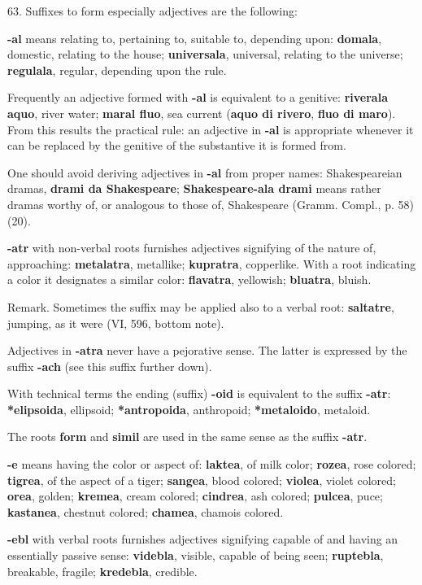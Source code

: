 63. Suffixes to form especially adjectives are the following: 

\textbf{-al} means relating to, pertaining to, suitable to, depending upon: \textbf{domala}, domestic, relating to the house; \textbf{universala}, universal, relating to the universe; \textbf{regulala}, regular, depending upon the rule. 

Frequently an adjective formed with \textbf{-al} is equivalent to a genitive: \textbf{riverala aquo}, river water; \textbf{maral fluo}, sea current (\textbf{aquo di rivero}, \textbf{fluo di maro}). From this results the practical rule: an adjective in \textbf{-al} is appropriate whenever it can be replaced by the genitive of the substantive it is formed from. 

One should avoid deriving adjectives in \textbf{-al} from proper names: Shakespeareian dramas, \textbf{drami da Shakespeare}; \textbf{Shakespeare-ala drami} means rather dramas worthy of, or analogous to those of, Shakespeare (Gramm. Compl., p. 58) (20).

\textbf{-atr} with non-verbal roots furnishes adjectives signifying of the nature of, approaching: \textbf{metalatra}, metallike; \textbf{kupratra}, copperlike. With a root indicating a color it designates a similar color: \textbf{flavatra}, yellowish; \textbf{bluatra}, bluish. 

\small Remark. Sometimes the suffix may be applied also to a verbal root: \textbf{saltatre}, jumping, as it were (VI, 596, bottom note). \normalsize

Adjectives in \textbf{-atra} never have a pejorative sense. The latter is expressed by the suffix \textbf{-ach} (see this suffix further down).

With technical terms the ending (suffix) \textbf{-oid} is equivalent to the suffix \textbf{-atr}: \textbf{*elipsoida}, ellipsoid; \textbf{*antropoida}, anthropoid; \textbf{*metaloido}, metaloid. 

The roots \textbf{form} and \textbf{simil} are used in the same sense as the suffix \textbf{-atr}. 

\textbf{-e} means having the color or aspect of: \textbf{laktea}, of milk color; \textbf{rozea}, rose colored; \textbf{tigrea}, of the aspect of a tiger; \textbf{sangea}, blood colored; \textbf{violea}, violet colored; \textbf{orea}, golden; \textbf{kremea}, cream colored; \textbf{cindrea}, ash colored; \textbf{pulcea}, puce; \textbf{kastanea}, chestnut colored; \textbf{chamea}, chamois colored. 

\textbf{-ebl} with verbal roots furnishes adjectives signifying capable of and having an essentially passive sense: \textbf{videbla}, visible, capable of being seen; \textbf{ruptebla}, breakable, fragile; \textbf{kredebla}, credible. 

